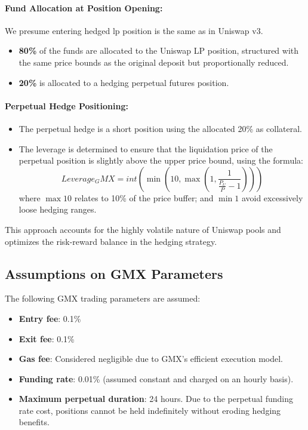 \documentclass[12pt]{article}
\begin{document}
\paragraph{Fund Allocation at Position Opening:} 
We presume entering hedged lp position is the same as in Uniswap v3.
\begin{itemize}
	\item \textbf{80\%} of the funds are allocated to the Uniswap LP position, structured with the same price bounds as the original deposit but proportionally reduced.
	\item \textbf{20\%} is allocated to a hedging perpetual futures position.
\end{itemize}

\paragraph{Perpetual Hedge Positioning:} 

\begin{itemize}
	\item The perpetual hedge is a short position using the allocated 20\% as collateral.
	\item The leverage is determined to ensure that the liquidation price of the perpetual position is slightly above the upper price bound, using the formula:
	$$Leverage_GMX = int(\min(10,\max(1,  \frac{1}{\frac{P_U}{P}-1})))$$
	where $\max 10$ relates to 10\% of the price buffer; and $\min 1$ avoid excessively loose hedging ranges.
\end{itemize}
This approach accounts for the highly volatile nature of Uniswap pools and optimizes the risk-reward balance in the hedging strategy. 

\subsection{Assumptions on GMX Parameters}
The following GMX trading parameters are assumed:
\begin{itemize}
	\item \textbf{Entry fee}: 0.1\%
	\item \textbf{Exit fee}: 0.1\%
	\item \textbf{Gas fee}: Considered negligible due to GMX's efficient execution model.
	\item \textbf{Funding rate}: 0.01\% (assumed constant and charged on an hourly basis).
	\item \textbf{Maximum perpetual duration}: 24 hours. Due to the perpetual funding rate cost, positions cannot be held indefinitely without eroding hedging benefits.	
\end{itemize}
\end{document}
